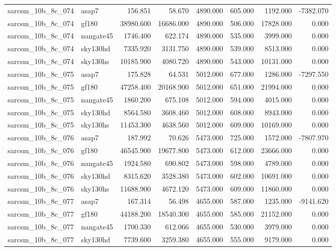 \begin{tabular}{llrrrrrr}
sarcsm\_10b\_8c\_074 & asap7 & 156.851 & 58.670 & 4890.000 & 605.000 & 1192.000 & -7382.070 \\
sarcsm\_10b\_8c\_074 & gf180 & 38980.600 & 16686.000 & 4890.000 & 506.000 & 17828.000 & 0.000 \\
sarcsm\_10b\_8c\_074 & nangate45 & 1746.400 & 622.174 & 4890.000 & 535.000 & 3999.000 & 0.000 \\
sarcsm\_10b\_8c\_074 & sky130hd & 7335.920 & 3131.750 & 4890.000 & 539.000 & 8513.000 & 0.000 \\
sarcsm\_10b\_8c\_074 & sky130hs & 10185.900 & 4080.720 & 4890.000 & 543.000 & 10131.000 & 0.000 \\
sarcsm\_10b\_8c\_075 & asap7 & 175.828 & 64.531 & 5012.000 & 677.000 & 1286.000 & -7297.550 \\
sarcsm\_10b\_8c\_075 & gf180 & 47258.400 & 20168.900 & 5012.000 & 651.000 & 21994.000 & 0.000 \\
sarcsm\_10b\_8c\_075 & nangate45 & 1860.200 & 675.108 & 5012.000 & 594.000 & 4015.000 & 0.000 \\
sarcsm\_10b\_8c\_075 & sky130hd & 8564.580 & 3608.460 & 5012.000 & 608.000 & 8943.000 & 0.000 \\
sarcsm\_10b\_8c\_075 & sky130hs & 11453.300 & 4638.560 & 5012.000 & 609.000 & 10169.000 & 0.000 \\
sarcsm\_10b\_8c\_076 & asap7 & 187.992 & 70.626 & 5473.000 & 725.000 & 1572.000 & -7807.970 \\
sarcsm\_10b\_8c\_076 & gf180 & 46545.900 & 19677.800 & 5473.000 & 612.000 & 23666.000 & 0.000 \\
sarcsm\_10b\_8c\_076 & nangate45 & 1924.580 & 690.802 & 5473.000 & 598.000 & 4789.000 & 0.000 \\
sarcsm\_10b\_8c\_076 & sky130hd & 8315.620 & 3528.380 & 5473.000 & 602.000 & 10691.000 & 0.000 \\
sarcsm\_10b\_8c\_076 & sky130hs & 11688.900 & 4672.120 & 5473.000 & 609.000 & 11860.000 & 0.000 \\
sarcsm\_10b\_8c\_077 & asap7 & 167.314 & 56.498 & 4655.000 & 587.000 & 1235.000 & -9141.620 \\
sarcsm\_10b\_8c\_077 & gf180 & 44188.200 & 18540.300 & 4655.000 & 585.000 & 21152.000 & 0.000 \\
sarcsm\_10b\_8c\_077 & nangate45 & 1700.330 & 612.066 & 4655.000 & 530.000 & 3979.000 & 0.000 \\
sarcsm\_10b\_8c\_077 & sky130hd & 7739.600 & 3259.380 & 4655.000 & 555.000 & 9179.000 & 0.000 \\

\end{tabular}
